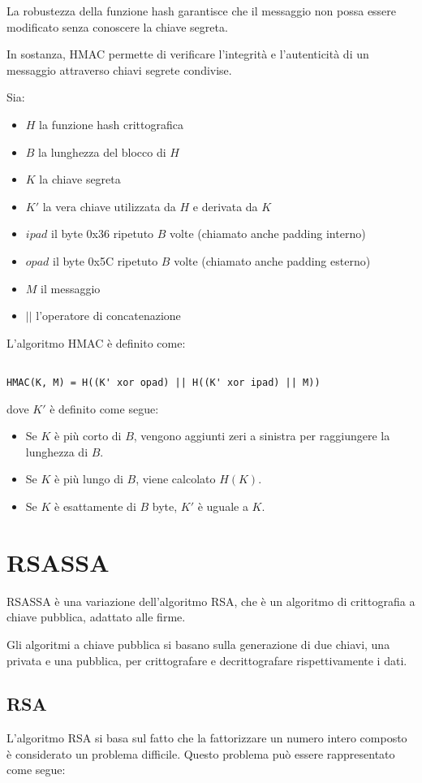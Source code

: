 \documentclass{article}
\begin{document}
La robustezza della funzione hash garantisce che il messaggio non possa essere modificato senza conoscere la chiave segreta.

In sostanza, HMAC permette di verificare l'integrità e l'autenticità di un messaggio attraverso chiavi segrete condivise.

Sia:
\begin{itemize}
	\item $H$ la funzione hash crittografica
	\item $B$ la lunghezza del blocco di $H$
	\item $K$ la chiave segreta
	\item $K'$ la vera chiave utilizzata da $H$ e derivata da $K$
	\item $ipad$ il byte 0x36 ripetuto $B$ volte (chiamato anche padding interno)
	\item $opad$ il byte 0x5C ripetuto $B$ volte (chiamato anche padding esterno)
	\item $M$ il messaggio
	\item $||$ l'operatore di concatenazione
\end{itemize}

L'algoritmo HMAC è definito come:
\begin{verbatim}

HMAC(K, M) = H((K' xor opad) || H((K' xor ipad) || M))

\end{verbatim}
dove $K'$ è definito come segue:
\begin{itemize}
	\item Se $K$ è più corto di $B$, vengono aggiunti zeri a sinistra per raggiungere la lunghezza di $B$.
	\item Se $K$ è più lungo di $B$, viene calcolato $H(K)$.
	\item Se $K$ è esattamente di $B$ byte, $K'$ è uguale a $K$.
\end{itemize}

\section{RSASSA}
RSASSA è una variazione dell'algoritmo RSA, che è un algoritmo di crittografia a chiave pubblica, adattato alle firme.

Gli algoritmi a chiave pubblica si basano sulla generazione di due chiavi, una privata e una pubblica, per crittografare e decrittografare rispettivamente i dati.

\subsection{RSA}
L'algoritmo RSA si basa sul fatto che la fattorizzare un numero intero composto è considerato un problema difficile.
Questo problema può essere rappresentato come segue:
\end{document}
